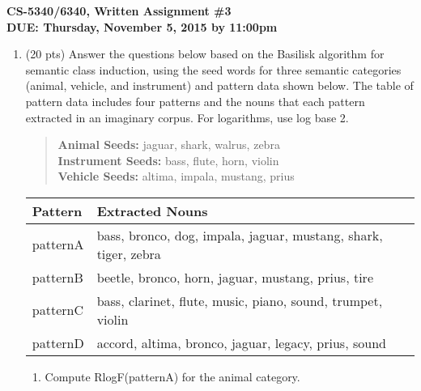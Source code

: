 \documentclass[11pt]{article}
\begin{document}
\large
\begin{center}
{\bf CS-5340/6340, Written Assignment \#3} \\
{\bf DUE: Thursday, November 5, 2015 by 11:00pm}
\end{center}
\normalsize

\begin{enumerate}  


\item (20 pts) Answer  the questions below based on  the Basilisk
  algorithm for  semantic class induction, using the seed words
 for three semantic categories ({\sc animal}, {\sc vehicle},
  and {\sc instrument}) and pattern data shown below. 
 The table of pattern data includes four patterns and the nouns that
 each pattern extracted  in an imaginary corpus.  For logarithms, use
 log base 2. 

\begin{quote}
\hspace*{.5in} {\bf Animal Seeds:} jaguar, shark, walrus, zebra \\
\hspace*{.5in} {\bf Instrument Seeds:} bass, flute, horn, violin \\
\hspace*{.5in} {\bf Vehicle Seeds:} altima, impala, mustang, prius \\
\end{quote}

\begin{center}
\begin{tabular}{ll} \hline
\textbf{Pattern} & \textbf{Extracted Nouns} \\ \hline
patternA & bass, bronco, dog, impala, jaguar, mustang, shark, tiger, zebra \\ 
patternB & beetle, bronco, horn, jaguar, mustang, prius, tire \\ 
patternC & bass, clarinet, flute, music, piano, sound, trumpet, violin \\ 
patternD & accord, altima, bronco, jaguar, legacy, prius, sound \\ \hline 
\end{tabular}
\end{center}

\vspace*{.2in}

\begin{enumerate}
\item Compute RlogF(patternA) for the {\sc animal} category. \\


\end{enumerate}
\end{enumerate}
\end{document}
